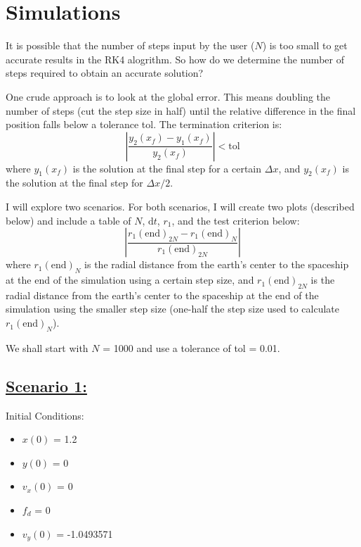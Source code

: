 \section{Simulations}
It is possible that the number of steps input by the user ($N$) is too small to get accurate results in the RK4 alogrithm. So how do we determine the number of steps required to obtain an accurate solution?

\vspace{\baselineskip}

One crude approach is to look at the global error. This means doubling the number of steps (cut the step size in half) until the relative difference in the final position falls below a tolerance tol. The termination criterion is:
\begin{equation*}
    \left|\frac{y_2(x_f) - y_1(x_f)}{y_2(x_f)}\right| < \textrm{tol}
\end{equation*}
where $y_1(x_f)$ is the solution at the final step for a certain $\Delta x$, and $y_2(x_f)$ is the solution at the final step for $\Delta x/2$.

\vspace{\baselineskip}

I will explore two scenarios. For both scenarios, I will create two plots (described below) and include a table of $N$, $\textrm{d}t$, $r_1$, and the test criterion below:
\color{cyan}
\begin{equation*}
    \left|\frac{r_1(\textrm{end})_{2N} - r_1(\textrm{end})_N}{r_1(\textrm{end})_{2N}}\right|
\end{equation*}
\color{white}
where $r_1(\textrm{end})_N$ is the radial distance from the earth’s center to the spaceship at the end of the simulation using a certain step size, and $r_1(\textrm{end})_{2N}$ is the radial distance from the earth’s center to the spaceship at the end of the simulation using the smaller step size (one-half the step size used to calculate $r_1(\textrm{end})_N$).

\vspace{\baselineskip}

We shall start with $N$ = 1000 and use a tolerance of tol = 0.01.

\pagebreak

\subsection*{\underline{Scenario 1:}}

Initial Conditions:
\begin{multicols}{4}
    \begin{itemize}
        \item $x(0)$ = 1.2
        \item $y(0)$ = 0
        \item $v_x(0)$ = 0
        \item $f_d$ = 0
        \item $v_y(0)$ = -1.0493571
    \end{itemize}
\end{multicols}

